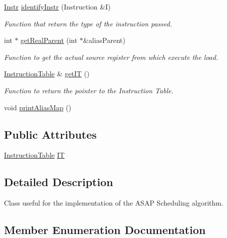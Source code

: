 \begin{DoxyCompactItemize}
\hyperlink{classoctantis_1_1SchedulingASAP_abbd454a56c823d34f835168cc31168f4}{Instr} \hyperlink{classoctantis_1_1SchedulingASAP_ac3f43eaa890ea2fe4457d0505b28da77}{identify\+Instr} (Instruction \&I)
\begin{DoxyCompactList}\small\item\em Function that return the type of the instruction passed. \end{DoxyCompactList}\item 
int $\ast$ \hyperlink{classoctantis_1_1SchedulingASAP_a310354a5c7a7613dd66c89b9c358528f}{get\+Real\+Parent} (int $\ast$\&alias\+Parent)
\begin{DoxyCompactList}\small\item\em Function to get the actual source register from which execute the load. \end{DoxyCompactList}\item 
\hyperlink{classoctantis_1_1InstructionTable}{Instruction\+Table} \& \hyperlink{classoctantis_1_1SchedulingASAP_a6c61709d8b29672b8e6cad471b81808d}{get\+IT} ()
\begin{DoxyCompactList}\small\item\em Function to return the pointer to the Instruction Table. \end{DoxyCompactList}\item 
void \hyperlink{classoctantis_1_1SchedulingASAP_ae3df036361ff37d74ca915487f1be0b4}{print\+Alias\+Map} ()
\end{DoxyCompactItemize}
\subsection*{Public Attributes}
\begin{DoxyCompactItemize}
\item 
\hyperlink{classoctantis_1_1InstructionTable}{Instruction\+Table} \hyperlink{classoctantis_1_1SchedulingASAP_ac53b361e1b4663c158238d93b931dce3}{IT}
\end{DoxyCompactItemize}


\subsection{Detailed Description}
Class useful for the implementation of the A\+S\+AP Scheduling algorithm. 

\subsection{Member Enumeration Documentation}
\mbox{\label{classoctantis_1_1SchedulingASAP_abbd454a56c823d34f835168cc31168f4}} 
